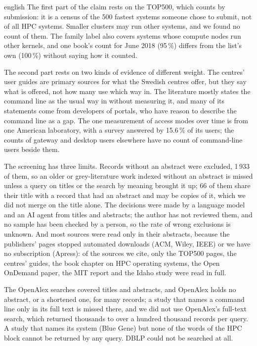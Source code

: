 \begin{onlyin}{english} %
The first part of the claim rests on the TOP500, which counts by
submission: it is a census of the 500 fastest systems someone chose to
submit, not of all HPC systems.  Smaller clusters may run other systems,
and we found no count of them.  The family label also covers systems
whose compute nodes run other kernels, and one book's count for June 2018
(95\,\%) differs from the list's own (100\,\%) without saying how it
counted.

The second part rests on two kinds of evidence of different weight.  The
centres' user guides are primary sources for what the Swedish centres
offer, but they say what is offered, not how many use which way in.  The
literature mostly states the command line as the usual way in without
measuring it, and many of its statements come from developers of
portals, who have reason to describe the command line as a gap.  The one
measurement of access modes over time is from one American laboratory,
with a survey answered by 15.6\,\% of its users; the counts of gateway
and desktop users elsewhere have no count of command-line users beside
them.

The screening has three limits.  Records without an abstract were
excluded, 1\,933 of them, so an older or grey-literature work indexed
without an abstract is missed unless a query on titles or the search by
meaning brought it up; 66 of them share their title with a record that
had an abstract and may be copies of it, which we did not merge on the
title alone.  The decisions were made by a language model and
an AI agent from titles and abstracts; the author has not reviewed them,
and no sample has been checked by a person, so the rate of wrong
exclusions is unknown.  And most sources were read only in their
abstracts, because the publishers' pages stopped automated downloads (ACM,
Wiley, IEEE) or we have no subscription (Apress): of the sources we cite,
only the TOP500 pages, the centres' guides, the book chapter on HPC
operating systems, the Open OnDemand paper, the MIT report and the Idaho
study were read in full.

The OpenAlex searches covered titles and abstracts, and OpenAlex holds no
abstract, or a shortened one, for many records; a study that names a
command line only in its full text is missed there, and we did not use
OpenAlex's full-text search, which returned thousands to over a hundred
thousand records per query.  A study that names its system (Blue Gene)
but none of the words of the HPC block cannot be returned by any query.
DBLP could not be searched at all.
\end{onlyin}
